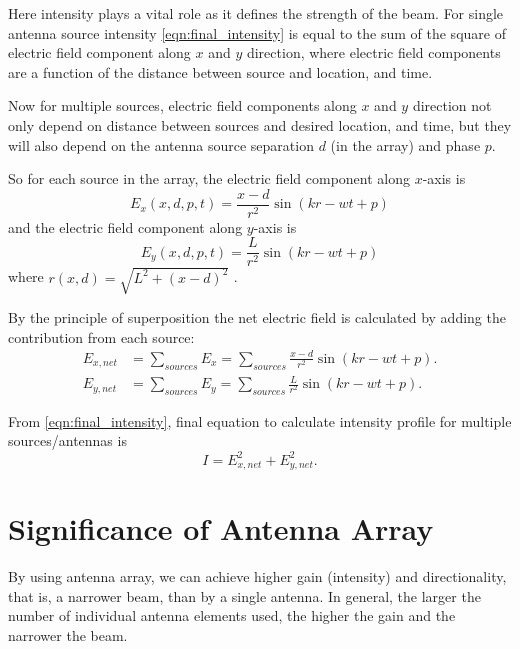 Here intensity plays a vital role as it defines the strength of the beam. For single antenna source intensity \eqref{eqn:final_intensity} is equal to the sum of the square of electric field component along $x$ and $y$ direction, where electric field components are a function of the distance between source and location, and time.

Now for multiple sources, electric field components along $x$ and $y$ direction not only depend on distance between sources and desired location, and time, but they will also depend on the antenna source separation $d$ (in the array) and phase $p$.

So for each source in the array, the electric field component along $x$-axis is
%
\begin{equation}
{E}_x(x,d,p,t) = \frac{x-d}{r^2}\sin(kr-wt+p)
\end{equation}
%
and the electric field component along $y$-axis is
%
\begin{equation}
{E}_y(x,d,p,t) = \frac{L}{r^2}\sin(kr-wt+p)
\end{equation}
%
where $r(x,d) = \sqrt{L^2+(x-d)^2}$ .

By the principle of superposition the net electric field is calculated by adding the contribution from each source:
%
\begin{equation}
   \begin{aligned}
      E_{x,net} &= \sum_{sources} E_x = \sum_{sources} \frac{x-d}{r^2}\sin(kr-wt+p).\\
      E_{y,net} &= \sum_{sources} E_y = \sum_{sources} \frac{L}{r^2}\sin(kr-wt+p).
   \end{aligned}
\end{equation}

From \eqref{eqn:final_intensity}, final equation to calculate intensity profile for multiple sources/antennas is
%
\begin{equation}
   I = E^2_{x,net} + E^2_{y,net}.
\end{equation}


\section{Significance of Antenna Array}

By using antenna array, we can achieve higher gain (intensity) and directionality, that is, a narrower beam, than by a single antenna. In general, the larger the number of individual antenna elements used, the higher the gain and the narrower the beam.

